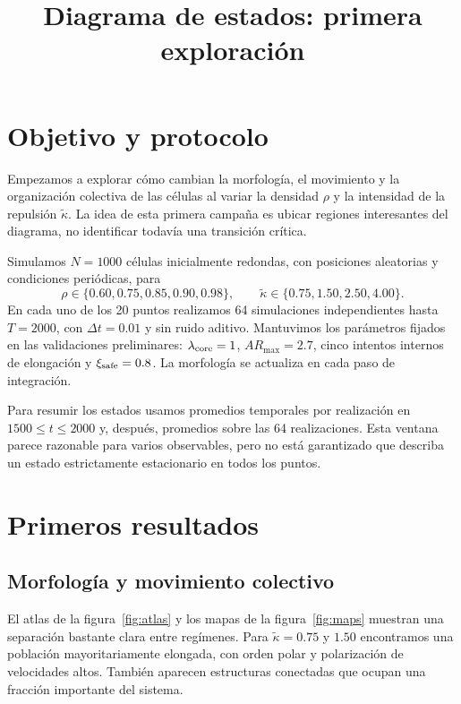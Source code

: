 \documentclass[11pt,a4paper]{article}
\title{Diagrama de estados: primera exploración}
\author{}
\date{}
\begin{document}
\maketitle

\section{Objetivo y protocolo}

Empezamos a explorar cómo cambian la morfología, el movimiento y la
organización colectiva de las células al variar la densidad $\rho$ y la
intensidad de la repulsión $\widetilde\kappa$. La idea de esta primera campaña
es ubicar regiones interesantes del diagrama, no identificar todavía una
transición crítica.

Simulamos $N=1000$ células inicialmente redondas, con posiciones aleatorias
y condiciones periódicas, para
\begin{equation}
\rho\in\{0.60,0.75,0.85,0.90,0.98\},\qquad
\widetilde\kappa\in\{0.75,1.50,2.50,4.00\}.
\end{equation}
En cada uno de los 20 puntos realizamos 64 simulaciones independientes hasta
$T=2000$, con $\Delta t=0.01$ y sin ruido aditivo. Mantuvimos los parámetros
fijados en las validaciones preliminares: $\lambda_{\rm core}=1$,
$AR_{\max}=2.7$, cinco intentos internos de elongación y
$\xi_{\rm safe}=0.8$. La morfología se actualiza en cada paso de integración.

Para resumir los estados usamos promedios temporales por realización en
$1500\leq t\leq2000$ y, después, promedios sobre las 64 realizaciones. Esta
ventana parece razonable para varios observables, pero no está garantizado
que describa un estado estrictamente estacionario en todos los puntos.

\section{Primeros resultados}

\subsection{Morfología y movimiento colectivo}

El atlas de la figura~\ref{fig:atlas} y los mapas de la
figura~\ref{fig:maps} muestran una separación bastante clara entre
regímenes. Para $\widetilde\kappa=0.75$ y $1.50$ encontramos una población
mayoritariamente elongada, con orden polar y polarización de velocidades
altos. También aparecen estructuras conectadas que ocupan una fracción
importante del sistema.
\end{document}
